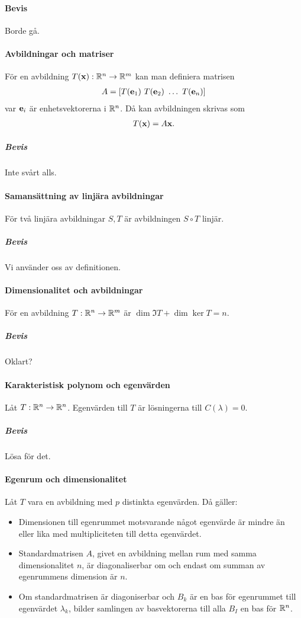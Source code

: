 \paragraph{Bevis}
Borde gå.

\paragraph{Avbildningar och matriser}
För en avbildning $T(\vect{x}): \R^n\to\R^m$ kan man definiera matrisen
\begin{align*}
	A = \left[ T(\vect{e}_1) ~ T(\vect{e}_2) ~ \dots ~ T(\vect{e}_n) \right]
\end{align*}
var $\vect{e}_i$ är enhetsvektorerna i $\mathbb{R}^n$. Då kan avbildningen skrivas som
\begin{align*}
	T(\vect{x}) = A\vect{x}.
\end{align*}

\subparagraph{Bevis}
Inte svårt alls.

\paragraph{Samansättning av linjära avbildningar}
För två linjära avbildningar $S, T$ är avbildningen $S\circ T$ linjär.

\subparagraph{Bevis}
Vi använder oss av definitionen.

\paragraph{Dimensionalitet och avbildningar}
För en avbildning $T: \mathbb{R}^n\to\mathbb{R}^m$ är $\dim{\Im T} + \dim{\ker{T}} = n$.

\subparagraph{Bevis}
Oklart?

\paragraph{Karakteristisk polynom och egenvärden}
Låt $T:\mathbb{R}^n\to\mathbb{R}^n$. Egenvärden till $T$ är lösningerna till $C(\lambda) = 0$.

\subparagraph{Bevis}
Lösa för det.

\paragraph{Egenrum och dimensionalitet}
Låt $T$ vara en avbildning med $p$ distinkta egenvärden. Då gäller:
\begin{itemize}
	\item Dimensionen till egenrummet motsvarande något egenvärde är mindre än eller lika med multipliciteten till detta egenvärdet.
	\item Standardmatrisen $A$, givet en avbildning mellan rum med samma dimensionalitet $n$, är diagonaliserbar om och endast om summan av egenrummens dimension är $n$.
	\item Om standardmatrisen är diagoniserbar och $B_k$ är en bas för egenrummet till egenvärdet $\lambda_k$, bilder samlingen av basvektorerna till alla $B_I$ en bas för $\mathbb{R}^n$.
\end{itemize}

